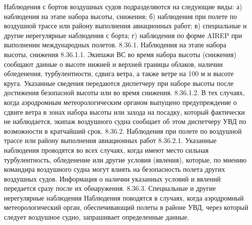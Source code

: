 Наблюдения с бортов воздушных судов подразделяются на следующие виды:
а)	наблюдения на этапе набора высоты, снижения;
б)	наблюдения при полете по воздушной трассе или району выполнения авиационных работ;
в)	специальные и другие нерегулярные наблюдения с борта;
г)	наблюдения по форме AIREP при выполнении международных полетов.
8.36.1.	Наблюдения на этапе набора высоты, снижения
8.36.1.1. Экипажи ВС во время набора высоты (снижения) сообщают данные о высоте нижней и верхней границы облаков, наличии обледенения, турбулентности, сдвига ветра, а также ветре на 100 м и высоте круга. Указанные сведения передаются диспетчеру при наборе высоты после достижения безопасной высоты или во время снижения.
8.36.1.2. В тех случаях, когда аэродромным метеорологическим органом выпущено предупреждение о сдвиге ветра в зонах набора высоты или захода на посадку, который фактически не наблюдается, экипаж воздушного судна сообщает об этом диспетчеру УВД по возможности в кратчайший срок.
8.36.2.	Наблюдения при полете по воздушной трассе или району выполнения авиационных работ
8.36.2.1. Указанные наблюдения проводятся во всех случаях, когда имеют место сильная турбулентность, обледенение или другие условия (явления), которые, по мнению командира воздушного судна могут влиять на безопасность полета других воздушных судов. Информация о наличии указанных условий и явлений передается сразу после их обнаружения.
8.36.3.	Специальные и другие нерегулярные наблюдения
Наблюдения поводятся в случаях, когда аэродромный метеорологический орган, обеспечивающий полеты в районе УВД, через который следует воздушное судно, запрашивает определенные данные.  
 
